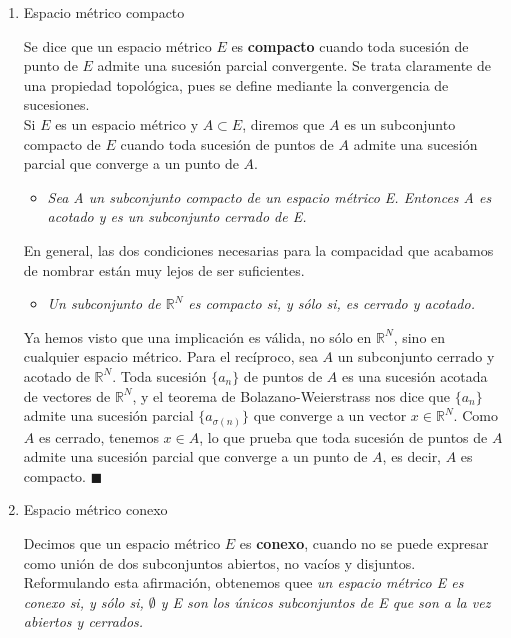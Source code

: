 \documentclass[a4paper, 12pt]{article}
\begin{document}
\begin{enumerate}[label=\textbf{\arabic*}.]
\begin{enumerate}[label=\textit{\alph*})]
\medskip
	
	\item Espacio métrico compacto
	
	Se dice que un espacio métrico \(E\) es \textbf{compacto} cuando toda sucesión de punto de \(E\) admite una sucesión parcial convergente. Se trata claramente de una propiedad topológica, pues se define mediante la convergencia de sucesiones. \\
	
	Si \(E\) es un espacio métrico y \(A \subset E\), diremos que \(A\) es un subconjunto compacto de \(E\) cuando toda sucesión de puntos de \(A\) admite una sucesión parcial que converge a un punto de \(A\).
	
		\begin{itemize}
		\item \textit{Sea A un subconjunto compacto de un espacio métrico E. Entonces A es acotado y es un subconjunto cerrado de E.}
		\end{itemize}
		
	En general, las dos condiciones necesarias para la compacidad que acabamos de nombrar están muy lejos de ser suficientes.
	
		\begin{itemize}
		\item \textit{Un subconjunto de \(\mathbb{R}^N\) es compacto si, y sólo si, es cerrado y acotado.}
		\end{itemize} 
		
	Ya hemos visto que una implicación es válida, no sólo en \(\mathbb{R}^N\), sino en cualquier espacio métrico. Para el recíproco, sea \(A\) un subconjunto cerrado y acotado de \(\mathbb{R}^N\). Toda sucesión \(\{a_n\}\) de puntos de \(A\) es una sucesión acotada de vectores de \(\mathbb{R}^N\), y el teorema de Bolazano-Weierstrass nos dice que \(\{a_n\}\) admite una sucesión parcial \(\{a_{\sigma (n)}\}\) que converge a un vector \(x \in \mathbb{R}^N\). Como \(A\) es cerrado, tenemos \(x \in A\), lo que prueba que toda sucesión de puntos de \(A\) admite una sucesión parcial que converge a un punto de \(A\), es decir, \(A\) es compacto. \hfill \(\blacksquare\) 
	
\medskip

	\item Espacio métrico conexo	
	
	Decimos que un espacio métrico \(E\) es \textbf{conexo}, cuando no se puede expresar como unión de dos subconjuntos abiertos, no vacíos y disjuntos. Reformulando esta afirmación, obtenemos quee \textit{un espacio métrico E es conexo si, y sólo si, \(\emptyset\) y E son los únicos subconjuntos de E que son a la vez abiertos y cerrados.}
	

\end{enumerate}
\end{enumerate}
\end{document}
